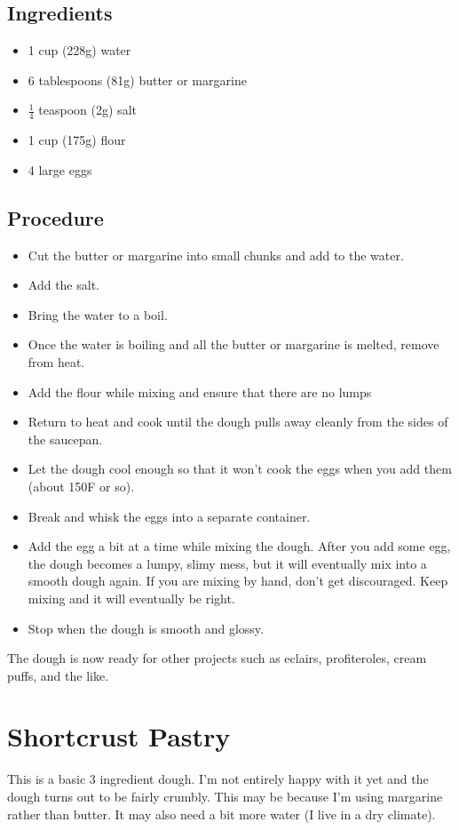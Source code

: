 \documentclass[10pt, openany]{book}
\begin{document}
\subsection{Ingredients}
\begin{itemize}
  \item 1 cup (228g) water
  \item 6 tablespoons (81g) butter or margarine
  \item $\frac{1}{4}$ teaspoon (2g) salt
  \item 1 cup (175g) flour
  \item 4 large eggs
\end{itemize}
\subsection{Procedure}
\begin{itemize}
  \item Cut the butter or margarine into small chunks and add to the water.
  \item Add the salt.
  \item Bring the water to a boil.
  \item Once the water is boiling and all the butter or margarine is melted, remove from heat.
  \item Add the flour while mixing and ensure that there are no lumps
  \item Return to heat and cook until the dough pulls away cleanly from the sides of the saucepan.
  \item Let the dough cool enough so that it won't cook the eggs when you add them (about 150\degree{}F or so).
  \item Break and whisk the eggs into a separate container.
  \item Add the egg a bit at a time while mixing the dough.  After you add some egg, the dough becomes a lumpy, slimy mess, but it will eventually mix into a smooth dough again.  If you are mixing by hand, don't get discouraged.  Keep mixing and it will eventually be right.
  \item Stop when the dough is smooth and glossy.
\end{itemize}
The dough is now ready for other projects such as eclairs, profiteroles, cream puffs, and the like.

\section{Shortcrust Pastry}
\label{pastry:shortcrust}
This is a basic 3 ingredient dough.  I'm not entirely happy with it yet and the dough turns out to be fairly crumbly.  This may be because I'm using margarine rather than butter.  It may also need a bit more water (I live in a dry climate).
\end{document}
